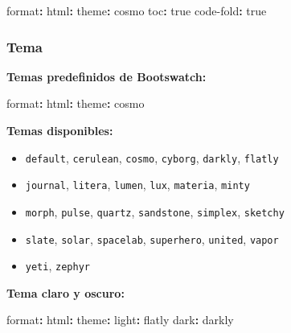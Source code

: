 \documentclass[
  doc,
  floatsintext,
  longtable,
  a4paper,
  nolmodern,
  notxfonts,
  notimes,
  12pt,
  colorlinks=true,linkcolor=blue,citecolor=blue,urlcolor=blue]{apa7}
\newenvironment{Shaded}{\begin{snugshade}}{\end{snugshade}}
\newcommand{\AttributeTok}[1]{\textcolor[rgb]{0.40,0.45,0.13}{#1}}
\newcommand{\CharTok}[1]{\textcolor[rgb]{0.13,0.47,0.30}{#1}}
\newcommand{\FunctionTok}[1]{\textcolor[rgb]{0.28,0.35,0.67}{#1}}
\newcommand{\KeywordTok}[1]{\textcolor[rgb]{0.00,0.23,0.31}{\textbf{#1}}}
\providecommand{\tightlist}{%
  \setlength{\itemsep}{0pt}\setlength{\parskip}{0pt}}
\begin{document}
\begin{Shaded}
\begin{Highlighting}[]
\FunctionTok{format}\KeywordTok{:}
\AttributeTok{  }\FunctionTok{html}\KeywordTok{:}
\AttributeTok{    }\FunctionTok{theme}\KeywordTok{:}\AttributeTok{ cosmo}
\AttributeTok{    }\FunctionTok{toc}\KeywordTok{:}\AttributeTok{ }\CharTok{true}
\AttributeTok{    }\FunctionTok{code{-}fold}\KeywordTok{:}\AttributeTok{ }\CharTok{true}
\end{Highlighting}
\end{Shaded}

\subsubsection{Tema}\label{tema}

\textbf{Temas predefinidos de Bootswatch:}

\begin{Shaded}
\begin{Highlighting}[]
\FunctionTok{format}\KeywordTok{:}
\AttributeTok{  }\FunctionTok{html}\KeywordTok{:}
\AttributeTok{    }\FunctionTok{theme}\KeywordTok{:}\AttributeTok{ cosmo}
\end{Highlighting}
\end{Shaded}

\textbf{Temas disponibles:}

\begin{itemize}
\tightlist
\item
  \texttt{default}, \texttt{cerulean}, \texttt{cosmo}, \texttt{cyborg},
  \texttt{darkly}, \texttt{flatly}
\item
  \texttt{journal}, \texttt{litera}, \texttt{lumen}, \texttt{lux},
  \texttt{materia}, \texttt{minty}
\item
  \texttt{morph}, \texttt{pulse}, \texttt{quartz}, \texttt{sandstone},
  \texttt{simplex}, \texttt{sketchy}
\item
  \texttt{slate}, \texttt{solar}, \texttt{spacelab}, \texttt{superhero},
  \texttt{united}, \texttt{vapor}
\item
  \texttt{yeti}, \texttt{zephyr}
\end{itemize}

\textbf{Tema claro y oscuro:}

\begin{Shaded}
\begin{Highlighting}[]
\FunctionTok{format}\KeywordTok{:}
\AttributeTok{  }\FunctionTok{html}\KeywordTok{:}
\AttributeTok{    }\FunctionTok{theme}\KeywordTok{:}
\AttributeTok{      }\FunctionTok{light}\KeywordTok{:}\AttributeTok{ flatly}
\AttributeTok{      }\FunctionTok{dark}\KeywordTok{:}\AttributeTok{ darkly}
\end{Highlighting}
\end{Shaded}
\end{document}
